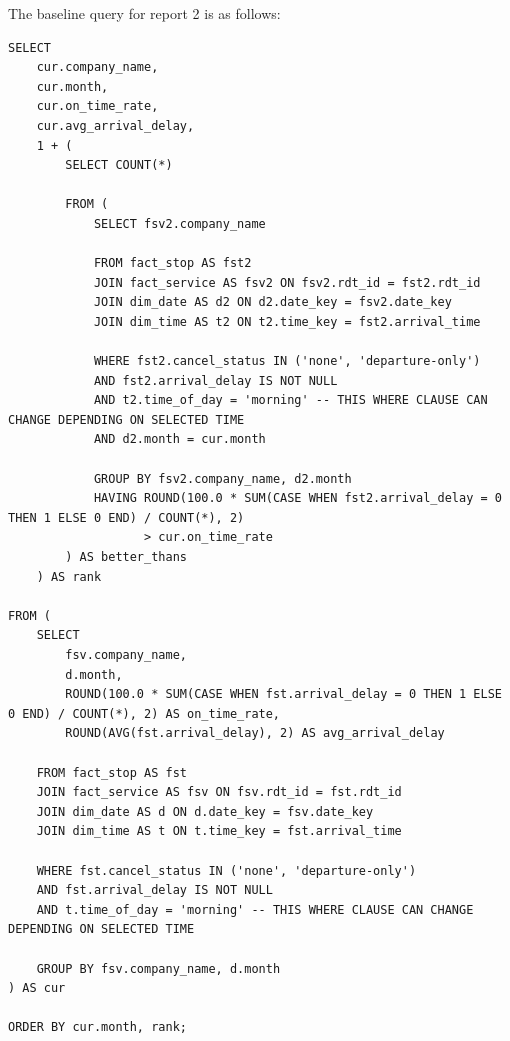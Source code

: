 The baseline query for report 2 is as follows:
\begin{lstlisting}
SELECT
	cur.company_name,
	cur.month,
	cur.on_time_rate,
	cur.avg_arrival_delay,
	1 + (
		SELECT COUNT(*)

		FROM (
			SELECT fsv2.company_name

			FROM fact_stop AS fst2
			JOIN fact_service AS fsv2 ON fsv2.rdt_id = fst2.rdt_id
			JOIN dim_date AS d2 ON d2.date_key = fsv2.date_key
			JOIN dim_time AS t2 ON t2.time_key = fst2.arrival_time

			WHERE fst2.cancel_status IN ('none', 'departure-only')
			AND fst2.arrival_delay IS NOT NULL
			AND t2.time_of_day = 'morning' -- THIS WHERE CLAUSE CAN CHANGE DEPENDING ON SELECTED TIME
			AND d2.month = cur.month

			GROUP BY fsv2.company_name, d2.month
			HAVING ROUND(100.0 * SUM(CASE WHEN fst2.arrival_delay = 0 THEN 1 ELSE 0 END) / COUNT(*), 2)
			       > cur.on_time_rate
		) AS better_thans
	) AS rank

FROM (
	SELECT
		fsv.company_name,
		d.month,
		ROUND(100.0 * SUM(CASE WHEN fst.arrival_delay = 0 THEN 1 ELSE 0 END) / COUNT(*), 2) AS on_time_rate,
		ROUND(AVG(fst.arrival_delay), 2) AS avg_arrival_delay

	FROM fact_stop AS fst
	JOIN fact_service AS fsv ON fsv.rdt_id = fst.rdt_id
	JOIN dim_date AS d ON d.date_key = fsv.date_key
	JOIN dim_time AS t ON t.time_key = fst.arrival_time

	WHERE fst.cancel_status IN ('none', 'departure-only')
	AND fst.arrival_delay IS NOT NULL
	AND t.time_of_day = 'morning' -- THIS WHERE CLAUSE CAN CHANGE DEPENDING ON SELECTED TIME

	GROUP BY fsv.company_name, d.month
) AS cur

ORDER BY cur.month, rank;

\end{lstlisting}


